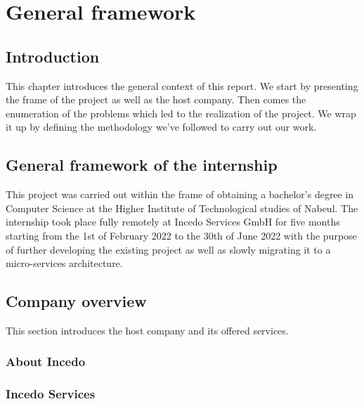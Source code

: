 \chapter{ General framework}
\setcounter{secnumdepth}{3}
\newpage

\section*{Introduction}
This chapter introduces the general context of this report. We start by presenting the frame of the project as well as the host company. Then comes the enumeration of the problems which led to the realization of the project. We wrap it up by defining the methodology we’ve followed to carry out our work. \citep{test1}

\section{General framework of the internship}
This project was carried out within the frame of obtaining a bachelor’s degree in Computer Science at the Higher Institute of Technological studies of Nabeul. The internship took place fully remotely at Incedo Services GmbH for five months starting from the 1st of February 2022 to the 30th of June 2022 with the purpose of further developing the existing project as well as slowly migrating it to a micro-services architecture. \cite{test2}

\section{Company overview}
This section introduces the host company and its offered services.
\subsection{About Incedo}
\subsection{Incedo Services}

